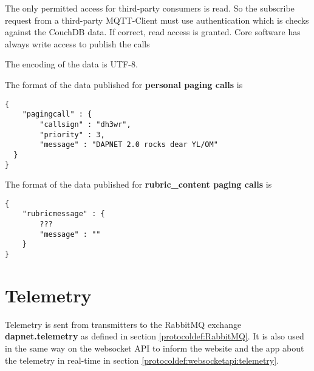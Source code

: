 The only permitted access for third-party consumers is read. So the subscribe request from a third-party MQTT-Client must use authentication which is checks against the CouchDB data. If correct, read access is granted. Core software has always write access to publish the calls 

The encoding of the data is UTF-8.

The format of the data published for \textbf{personal paging calls} is
\begin{lstlisting}
{
	"pagingcall" : {
		"callsign" : "dh3wr",
		"priority" : 3,
		"message" : "DAPNET 2.0 rocks dear YL/OM"
  }
}
\end{lstlisting}

The format of the data published for \textbf{rubric\_content paging calls} is
\begin{lstlisting}
{
	"rubricmessage" : {
		???
		"message" : ""
	}
}
\end{lstlisting}



\section{Telemetry}
\label{protocoldef:telemetry}
Telemetry is sent from transmitters to the RabbitMQ exchange \textbf{dapnet.telemetry} as defined in section \ref{protocoldef:RabbitMQ}. It is also used in the same way on the websocket API to inform the website and the app about the telemetry in real-time in section \ref{protocoldef:websocketapi:telemetry}.

